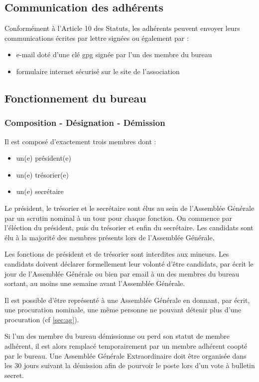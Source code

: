 \documentclass[a4paper,french,10pt]{article}
\begin{document}
\subsection{Communication des adhérents}
Conformément à l'Article 10 des Statuts, les adhérents peuvent envoyer leurs communications écrites par lettre signées ou également par :
\begin{itemize}
\item e-mail doté d'une clé gpg signée par l'un des membre du bureau
\item formulaire internet sécurisé sur le site de l'association
\end{itemize}


\subsection{Fonctionnement du bureau}

\subsubsection*{Composition - Désignation - Démission}
\label{sec:comp-design}
Il est composé d'exactement trois membres dont :
\begin{itemize}
\item un(e) président(e)
\item un(e) trésorier(e)
\item un(e) secrétaire
\end{itemize}

Le président, le trésorier et le secrétaire sont élus au sein de
l'Assemblée Générale par un scrutin nominal à un tour pour chaque
fonction. On commence par l'éléction du président, puis du trésorier
et enfin du secrétaire.  Les candidats sont élu à la majorité des
membres présents lors de l'Assemblée Générale.

Les fonctions de président et de trésorier sont interdites aux mineurs. Les candidats doivent déclarer
formellement leur volonté d'être candidats, par écrit le jour de l'Assemblée Générale
ou bien par email à un des membres du bureau sortant, au moins une
semaine avant l'Assemblée Générale.


Il est possible d’être représenté à une Assemblée Générale en donnant, par écrit, une procuration nominale, une même personne ne pouvant détenir plus
d’une procuration (cf \ref{sec:ag}).

Si l'un des membre du bureau démissionne ou perd son statut de membre adhérent, il est alors remplacé temporairement par un membre adhérent coopté par le bureau. Une Assemblée Générale Extraordinaire doit être organisée dans les 30 jours suivant la démission afin de pourvoir le poste lors d'un vote à bulletin secret.
\end{document}

